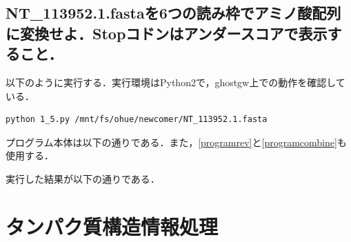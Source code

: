 \documentclass[uplatex,a4j]{jsarticle}
\begin{document}
  \subsection{NT\_113952.1.fastaを6つの読み枠でアミノ酸配列に変換せよ．Stopコドンはアンダースコアで表示すること．}
  以下のように実行する．実行環境はPython2で，ghostgw上での動作を確認している．
  \begin{lstlisting}[caption=実行方法, label=run5]
    python 1_5.py /mnt/fs/ohue/newcomer/NT_113952.1.fasta
  \end{lstlisting}
  プログラム本体は以下の通りである．また，\ref{programrev}と\ref{programcombine}も使用する．
  
  
  実行した結果が以下の通りである．
  
  
  \section{タンパク質構造情報処理}
\end{document}
